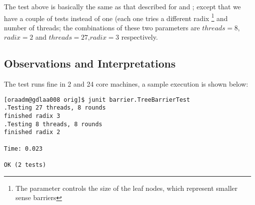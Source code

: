 The test above is basically the same as that described for
 and ; except that we have a
couple of tests instead of one (each one tries a different radix
\footnote{The  parameter controls the
  size of the leaf nodes, which represent smaller sense barriers}
and number of threads; the combinations of these two parameters are
$threads=8$,$radix=2$ and $threads=27$,$radix=3$ respectively.

\subsection{Observations and Interpretations}
The test runs fine in 2 and 24 core machines, a sample execution is
shown below: \\

\begin{verbatim}
[oraadm@gdlaa008 orig]$ junit barrier.TreeBarrierTest
.Testing 27 threads, 8 rounds
finished radix 3
.Testing 8 threads, 8 rounds
finished radix 2

Time: 0.023

OK (2 tests)
\end{verbatim}
\hfill

